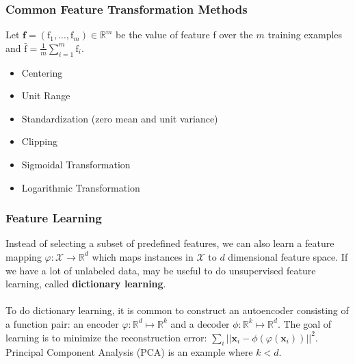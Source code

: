 \documentclass{article}
\begin{document}
   \subsubsection{Common Feature Transformation Methods}
   Let $\textbf{f} = (\text{f}_1,...,\text{f}_m) \in \mathbb{R}^m$ be the value of feature f over the $m$ training examples and $\bar{\text{f}} = \frac{1}{m} \sum_{i=1}^m \text{f}_i$.
   \begin{itemize}
   \item Centering
   \item Unit Range
   \item Standardization (zero mean and unit variance)
   \item Clipping
   \item Sigmoidal Transformation
   \item Logarithmic Transformation
   \end{itemize}
   
   \subsubsection{Feature Learning}
   Instead of selecting a subset of predefined features, we can also learn a feature mapping $\varphi : \mathcal{X} \rightarrow \mathbb{R}^d$ which maps instances in $\mathcal{X}$ to $d$ dimensional feature space. If we have a lot of unlabeled data, may be useful to do unsupervised feature learning, called \textbf{dictionary learning}. 
   \\\\
   To do dictionary learning, it is common to construct an autoencoder consisting of a function pair: an encoder $\varphi: \mathbb{R}^d \mapsto \mathbb{R}^k$ and  a decoder $\phi: \mathbb{R}^k \mapsto \mathbb{R}^d$. The goal of learning is to minimize the reconstruction error: $\sum_i || \textbf{x}_i - \phi(\varphi(\textbf{x}_i)) ||^2$. Principal Component Analysis (PCA) is an example where $k < d$.
   
\end{document}
